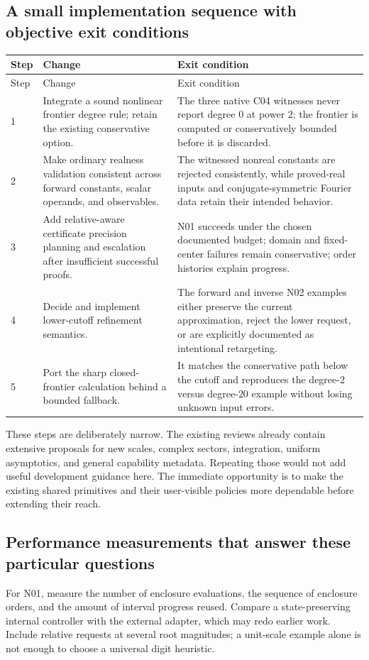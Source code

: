 \documentclass[11pt,letterpaper]{article}
\begin{document}
\subsection{A small implementation sequence with objective exit conditions}
\begin{longtable}{@{}p{}p{}p{}@{}}
\toprule
Step & Change & Exit condition\\
\midrule\endfirsthead
\toprule Step & Change & Exit condition\\\midrule\endhead
1 & Integrate a sound nonlinear frontier degree rule; retain the existing conservative option. & The three native C04 witnesses never report degree $0$ at power $2$; the frontier is computed or conservatively bounded before it is discarded.\\[6pt]
2 & Make ordinary realness validation consistent across forward constants, scalar operands, and observables. & The witnessed nonreal constants are rejected consistently, while proved-real inputs and conjugate-symmetric Fourier data retain their intended behavior.\\[6pt]
3 & Add relative-aware certificate precision planning and escalation after insufficient successful proofs. & N01 succeeds under the chosen documented budget; domain and fixed-center failures remain conservative; order histories explain progress.\\[6pt]
4 & Decide and implement lower-cutoff refinement semantics. & The forward and inverse N02 examples either preserve the current approximation, reject the lower request, or are explicitly documented as intentional retargeting.\\[6pt]
5 & Port the sharp closed-frontier calculation behind a bounded fallback. & It matches the conservative path below the cutoff and reproduces the degree-$2$ versus degree-$20$ example without losing unknown input errors.\\
\bottomrule
\end{longtable}

These steps are deliberately narrow. The existing reviews already contain extensive proposals for new scales, complex sectors, integration, uniform asymptotics, and general capability metadata. Repeating those would not add useful development guidance here. The immediate opportunity is to make the existing shared primitives and their user-visible policies more dependable before extending their reach.

\subsection{Performance measurements that answer these particular questions}
For N01, measure the number of enclosure evaluations, the sequence of enclosure orders, and the amount of interval progress reused. Compare a state-preserving internal controller with the external adapter, which may redo earlier work. Include relative requests at several root magnitudes; a unit-scale example alone is not enough to choose a universal digit heuristic.
\end{document}
